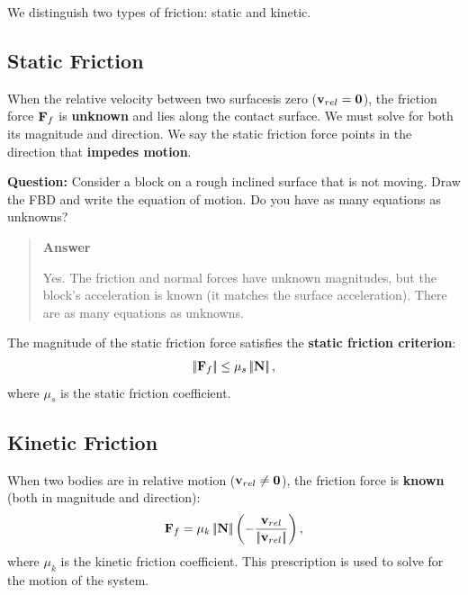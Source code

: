 \documentclass[
  letterpaper,
  DIV=11,
  numbers=noendperiod]{scrreprt}
\newcommand{\lnorm}{\left|\!\left|}
\newcommand{\rnorm}{\right|\!\right|}
\newcommand{\lp}{\left(}
\newcommand{\rp}{\right)}
\begin{document}
We distinguish two types of friction: static and kinetic.

\subsection{Static Friction}\label{static-friction}

When the relative velocity between two surfacesis zero
(\({\bf v}_{rel} = {\bf 0}\)), the friction force \({\bf F}_f\) is
\textbf{unknown} and lies along the contact surface. We must solve for
both its magnitude and direction. We say the static friction force
points in the direction that \textbf{impedes motion}.

\begin{tcolorbox}[enhanced jigsaw, arc=.35mm, bottomrule=.15mm, bottomtitle=1mm, breakable, colback=white, colbacktitle=quarto-callout-tip-color!10!white, colframe=quarto-callout-tip-color-frame, coltitle=black, left=2mm, leftrule=.75mm, opacityback=0, opacitybacktitle=0.6, rightrule=.15mm, title=\textcolor{quarto-callout-tip-color}{\faLightbulb}\hspace{0.5em}{Think!}, titlerule=0mm, toprule=.15mm, toptitle=1mm]

\textbf{Question:} Consider a block on a rough inclined surface that is
not moving. Draw the FBD and write the equation of motion. Do you have
as many equations as unknowns?

\begin{quote}
\textbf{Answer}

Yes. The friction and normal forces have unknown magnitudes, but the
block's acceleration is known (it matches the surface acceleration).
There are as many equations as unknowns.
\end{quote}

\end{tcolorbox}

The magnitude of the static friction force satisfies the \textbf{static
friction criterion}: \begin{align}
    \lnorm{\bf F}_f\rnorm \leq \mu_s\lnorm{\bf N}\rnorm,
\end{align} where \(\mu_s\) is the static friction coefficient.

\subsection{Kinetic Friction}\label{kinetic-friction}

When two bodies are in relative motion (\({\bf v}_{rel} \neq {\bf 0}\)),
the friction force is \textbf{known} (both in magnitude and direction):
\begin{align}
    {\bf F}_f = \mu_k\lnorm{\bf N}\rnorm\lp-\frac{{\bf v}_{rel}}{\lnorm{\bf v}_{rel}\rnorm}\rp,
\end{align} where \(\mu_k\) is the kinetic friction coefficient. This
prescription is used to solve for the motion of the system.
\end{document}
